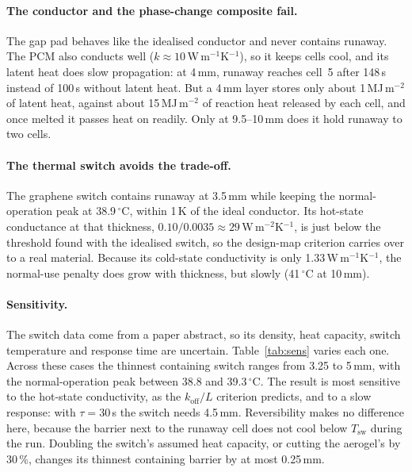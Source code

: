\documentclass[11pt]{article}
\newcommand{\koff}{k_\mathrm{off}}
\newcommand{\Tsw}{T_\mathrm{sw}}
\begin{document}
\paragraph{The conductor and the phase-change composite fail.} The gap pad behaves like the
idealised conductor and never contains runaway. The PCM also conducts well
($k \approx 10$\,W\,m$^{-1}$K$^{-1}$), so it keeps cells cool, and its latent heat does
slow propagation: at 4\,mm, runaway reaches cell~5 after 148\,s instead of 100\,s without
latent heat. But a 4\,mm layer stores only about 1\,MJ\,m$^{-2}$ of latent heat, against
about 15\,MJ\,m$^{-2}$ of reaction heat released by each cell, and once melted it passes
heat on readily. Only at 9.5--10\,mm does it hold runaway to two cells.

\paragraph{The thermal switch avoids the trade-off.} The graphene switch contains runaway at
3.5\,mm while keeping the normal-operation peak at 38.9\,$^\circ$C, within 1\,K of the ideal
conductor. Its hot-state conductance at that thickness,
$0.10/0.0035 \approx 29$\,W\,m$^{-2}$K$^{-1}$, is just below the threshold found with the
idealised switch, so the design-map criterion carries over to a real material. Because
its cold-state conductivity is only 1.33\,W\,m$^{-1}$K$^{-1}$, the normal-use penalty does
grow with thickness, but slowly (41\,$^\circ$C at 10\,mm).

\paragraph{Sensitivity.} The switch data come from a paper abstract, so its density, heat
capacity, switch temperature and response time are uncertain. Table~\ref{tab:sens} varies
each one. Across these cases the thinnest containing switch ranges from 3.25 to 5\,mm,
with the normal-operation peak between 38.8 and 39.3\,$^\circ$C. The result is most
sensitive to the hot-state conductivity, as the $\koff/L$ criterion predicts, and to a
slow response: with $\tau = 30$\,s the switch needs 4.5\,mm. Reversibility makes no
difference here, because the barrier next to the runaway cell does not cool below $\Tsw$
during the run. Doubling the switch's assumed heat capacity, or cutting the aerogel's by
30\,\%, changes its thinnest containing barrier by at most 0.25\,mm.
\end{document}
